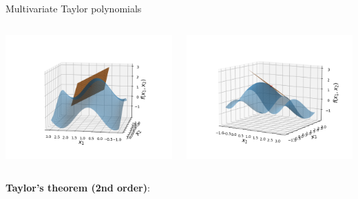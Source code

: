\begin{vbframe}{Multivariate Taylor polynomials}
\begin{columns}
  \begin{column}{0.4\textwidth}
    \includegraphics[width = \textwidth]{figure_man/Taylor2D/Taylor2D_1st100.png}
  \end{column}
  \begin{column}{0.4\textwidth}
    \includegraphics[width = \textwidth]{figure_man/Taylor2D/Taylor2D_1st301.png}
  \end{column}
\end{columns}

\framebreak 

\textbf{Taylor's theorem (2nd order)}: 


\end{vbframe}
